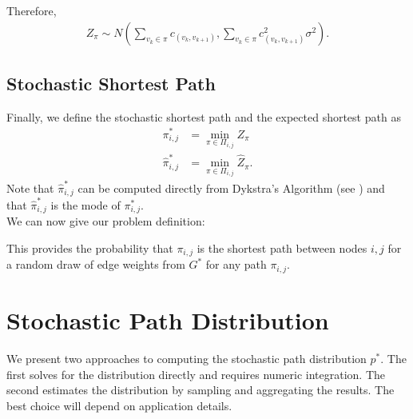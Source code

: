 \documentclass[twocolumn]{article}
\begin{document}
Therefore,
\begin{gather}
Z_{\pi} \sim N( \sum_{v_{k} \in \pi} c_{(v_{k},v_{k+1})} ,  \sum_{v_{k} \in \pi} c_{(v_{k},v_{k+1})}^{2}\sigma^{2}).
\end{gather}


\subsection{Stochastic Shortest Path}
Finally, we define the stochastic shortest path and the expected shortest path as
\begin{align}
\pi_{i,j}^{\ast}  & = \min_{\pi \in \Pi_{i,j}} Z_{\pi} \\
\hat{\pi}_{i,j}^{\ast} & = \min_{\pi \in \Pi_{i,j}} \hat{Z}_{\pi}.
\end{align}
Note that $\hat{\pi}_{i,j}^{\ast}$ can be computed directly from Dykstra's Algorithm (see \cite{dijkstra1959}) and that $\hat{\pi}_{i,j}^{\ast}$ is the mode of $\pi_{i,j}^{\ast}$.\\

We can now give our problem definition:
\begin{quote}
\end{quote}

This provides the probability that $\pi_{i,j}$ is the shortest path between nodes $i,j$ for a random draw of edge weights from $G^{\ast}$ for any path $\pi_{i,j}$.




\section{Stochastic Path Distribution}

We present two approaches to computing the stochastic path distribution  $p^{*}$. The first solves for the distribution directly and requires numeric integration. The second estimates the distribution by sampling and aggregating the results. The best choice will depend on application details.
\end{document}
